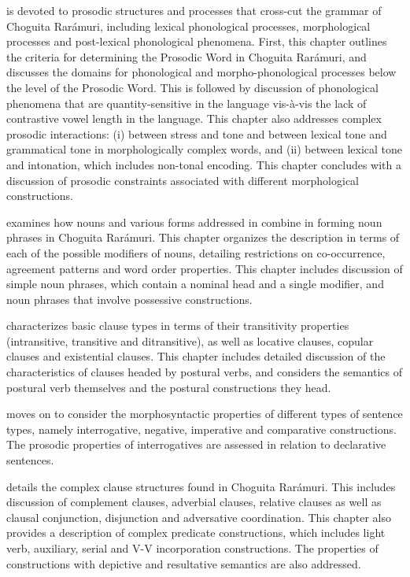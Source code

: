 \medskip

\noindent \textbf{} is devoted to prosodic structures and processes that cross-cut the grammar of Choguita Rarámuri, including lexical phonological processes, morphological processes and post-lexical phonological phenomena. First, this chapter outlines the criteria for determining the Prosodic Word in Choguita Rarámuri, and discusses the domains for phonological and morpho-phonological processes below the level of the Prosodic Word. This is followed by discussion of phonological phenomena that are quantity-sensitive in the language vis-à-vis the lack of contrastive vowel length in the language. This chapter also addresses complex prosodic interactions: (i) between stress and tone and between lexical tone and grammatical tone in morphologically complex words, and (ii) between lexical tone and intonation, which includes non-tonal encoding. This chapter concludes with a discussion of prosodic constraints associated with different morphological constructions.

\medskip

\noindent \textbf{} examines how nouns and various forms addressed in  combine in forming noun phrases in Choguita Rarámuri. This chapter organizes the description in terms of each of the possible modifiers of nouns, detailing restrictions on co-occurrence, agreement patterns and word order properties. This chapter includes discussion of simple noun phrases, which contain a nominal head and a single modifier, and noun phrases that involve possessive constructions.

\medskip

\noindent \textbf{} characterizes basic clause types in terms of their transitivity properties (intransitive, transitive and ditransitive), as well as locative clauses, copular clauses and existential clauses. This chapter includes detailed discussion of the characteristics of clauses headed by postural verbs, and considers the semantics of postural verb themselves and the postural constructions they head.

\medskip

\noindent \textbf{} moves on to consider the morphosyntactic properties of different types of sentence types, namely interrogative, negative, imperative and comparative constructions. The prosodic properties of interrogatives are assessed in relation to declarative sentences.

\medskip

\noindent \textbf{} details the complex clause structures found in Choguita Rarámuri. This includes discussion of complement clauses, adverbial clauses, relative clauses as well as clausal conjunction, disjunction and adversative coordination. This chapter also provides a description of complex predicate constructions, which includes light verb, auxiliary, serial and V-V incorporation constructions. The properties of constructions with depictive and resultative semantics are also addressed.
